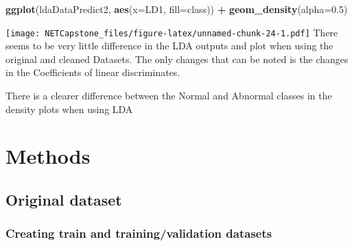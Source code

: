 \documentclass[
]{article}
\newenvironment{Shaded}{\begin{snugshade}}{\end{snugshade}}
\newcommand{\CommentTok}[1]{\textcolor[rgb]{0.56,0.35,0.01}{\textit{#1}}}
\newcommand{\DataTypeTok}[1]{\textcolor[rgb]{0.13,0.29,0.53}{#1}}
\newcommand{\DecValTok}[1]{\textcolor[rgb]{0.00,0.00,0.81}{#1}}
\newcommand{\FloatTok}[1]{\textcolor[rgb]{0.00,0.00,0.81}{#1}}
\newcommand{\KeywordTok}[1]{\textcolor[rgb]{0.13,0.29,0.53}{\textbf{#1}}}
\newcommand{\NormalTok}[1]{#1}
\newcommand{\OperatorTok}[1]{\textcolor[rgb]{0.81,0.36,0.00}{\textbf{#1}}}
\newcommand{\OtherTok}[1]{\textcolor[rgb]{0.56,0.35,0.01}{#1}}
\newcommand{\StringTok}[1]{\textcolor[rgb]{0.31,0.60,0.02}{#1}}
\begin{document}
\begin{Shaded}
\begin{Highlighting}[]
\KeywordTok{ggplot}\NormalTok{(ldaDataPredict2, }\KeywordTok{aes}\NormalTok{(}\DataTypeTok{x=}\NormalTok{LD1, }\DataTypeTok{fill=}\NormalTok{class)) }\OperatorTok{+}\StringTok{ }\KeywordTok{geom_density}\NormalTok{(}\DataTypeTok{alpha=}\FloatTok{0.5}\NormalTok{)}
\end{Highlighting}
\end{Shaded}

\texttt{[image: NETCapstone\_files/figure-latex/unnamed-chunk-24-1.pdf]}
There seems to be very little difference in the LDA outputs and plot
when using the original and cleaned Datasets. The only changes that can
be noted is the changes in the Coefficients of linear discriminates.

There is a clearer difference between the Normal and Abnormal classes in
the density plots when using LDA

\newpage

\hypertarget{methods}{%
\section{Methods}\label{methods}}

\hypertarget{original-dataset}{%
\subsection{Original dataset}\label{original-dataset}}

\hypertarget{creating-train-and-trainingvalidation-datasets}{%
\subsubsection{Creating train and training/validation
datasets}\label{creating-train-and-trainingvalidation-datasets}}

\begin{Shaded}
\end{Shaded}
\end{document}
